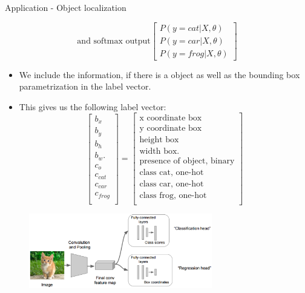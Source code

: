 \begin{vbframe}{Application - Object localization}
\begin{itemize}
$$            \text{and softmax output}
            \begin{bmatrix}
            P(y = cat| X, \theta)\\
            P(y = car| X, \theta)\\
            P(y = frog| X, \theta)
            \end{bmatrix}
            $$
                \end{itemize}
            \framebreak
            \begin{itemize}
            \item We include the information, if there is a object as well as the bounding box parametrization in the label vector.
            \item This gives us the following label vector:
                $$
                \begin{bmatrix}
            b_x\\
            b_y \\
            b_h \\
            b_w.\\
            c_o \\
            c_{cat} \\
            c_{car} \\
            c_{frog} \\
            \end{bmatrix} =             
                \begin{bmatrix}
            \text{x coordinate box}\\
            \text{y coordinate box} \\
            \text{height box} \\
            \text{width box}.\\
            \text{presence of object, binary} \\
            \text{class cat, one-hot} \\
            \text{class car, one-hot}\\
            \text{class frog, one-hot} \\
            \end{bmatrix}
            $$
                \end{itemize}
            \framebreak
            \begin{figure}
            \centering
            \includegraphics[width=8cm]{figure/naive_localization.png}

\end{figure}
\end{vbframe}
